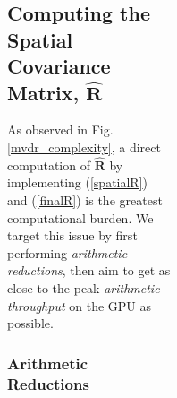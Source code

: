 \documentclass[12pt,journal,draftclsnofoot,onecolumn]{IEEEtran}
\newcounter{todoidx}
\newlength\marginparwidthsmall
\newcommand\todo[1]{%
      \addtocounter{todoidx}{1}%
      {\color{Red}\bf(\thetodoidx{})}%
      \marginpar{%
         {\vspace*{-10pt}\color{Red}\fbox{\bf\thetodoidx{}}}\\%
         \fcolorbox{red}{todobackground}{\parbox{\marginparwidthsmall}{\scriptsize #1}}}}
\newcommand\todo[1]{}
\newcommand\mat[1]{\boldsymbol{#1}}
\newcommand\1{\vec 1}
\newcommand*\eR{\mat{\hat R}}
\begin{document}
\begin{figure}[H]
\begin{figure}[!t]
\begin{figure}[!t]
\begin{figure}[t]
% 
% 





\subsection{Computing the Spatial Covariance Matrix, $\hat{\boldsymbol{R}}$}\label{computing_eR}


As observed in Fig. \ref{mvdr_complexity}, a direct computation of $\eR$ by implementing (\ref{spatialR}) and (\ref{finalR}) is the greatest computational burden. We target this issue by first performing \emph{arithmetic reductions}, then aim to get as close to the peak \emph{arithmetic throughput} on the GPU as possible.

\subsubsection{Arithmetic Reductions}


\end{figure}
\end{figure}
\end{figure}
\end{figure}
\end{document}
